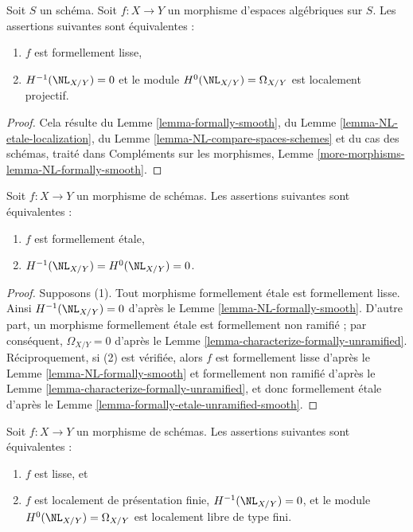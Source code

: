 \begin{lemma}
\label{lemma-NL-formally-smooth}
Soit $S$ un schéma.
Soit $f : X \to Y$ un morphisme d'espaces algébriques sur $S$.
Les assertions suivantes sont équivalentes :
\begin{enumerate}
\item $f$ est formellement lisse,
\item $H^{-1}(\NL_{X/Y}) = 0$ et le module $H^0(\NL_{X/Y}) = \Omega_{X/Y}$
est localement projectif.
\end{enumerate}
\end{lemma}

\begin{proof}
Cela résulte du
Lemme \ref{lemma-formally-smooth}, du
Lemme \ref{lemma-NL-etale-localization}, du
Lemme \ref{lemma-NL-compare-spaces-schemes}
et du cas des schémas, traité dans
Compléments sur les morphismes, Lemme \ref{more-morphisms-lemma-NL-formally-smooth}.
\end{proof}

\begin{lemma}
\label{lemma-NL-formally-etale}
Soit $f : X \to Y$ un morphisme de schémas. Les assertions suivantes sont équivalentes :
\begin{enumerate}
\item $f$ est formellement étale,
\item $H^{-1}(\NL_{X/Y}) = H^0(\NL_{X/Y}) = 0$.
\end{enumerate}
\end{lemma}

\begin{proof}
Supposons (1). Tout morphisme formellement étale est formellement lisse.
Ainsi $H^{-1}(\NL_{X/Y}) = 0$ d'après le Lemme \ref{lemma-NL-formally-smooth}.
D'autre part, un morphisme formellement étale est formellement non ramifié ;
par conséquent, $\Omega_{X/Y} = 0$ d'après le
Lemme \ref{lemma-characterize-formally-unramified}.
Réciproquement, si (2) est vérifiée, alors $f$ est formellement lisse d'après le
Lemme \ref{lemma-NL-formally-smooth}
et formellement non ramifié d'après le
Lemme \ref{lemma-characterize-formally-unramified},
et donc formellement étale d'après le
Lemme \ref{lemma-formally-etale-unramified-smooth}.
\end{proof}

\begin{lemma}
\label{lemma-NL-smooth}
Soit $f : X \to Y$ un morphisme de schémas. Les assertions suivantes sont équivalentes :
\begin{enumerate}
\item $f$ est lisse, et
\item $f$ est localement de présentation finie,
$H^{-1}(\NL_{X/Y}) = 0$, et le module $H^0(\NL_{X/Y}) = \Omega_{X/Y}$
est localement libre de type fini.
\end{enumerate}
\end{lemma}

